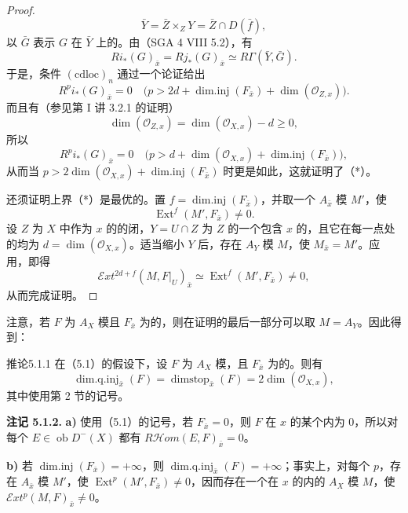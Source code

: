 \begin{proof}
\[
\bar Y=\bar Z\times_ZY=\bar Z\cap D(\bar f),
\]
以 $\bar G$ 表示 $G$ 在 $\bar Y$ 上的。由（SGA 4 VIII 5.2），有
\[
Ri_*(G)_{\bar x}=Rj_*(G)_{\bar x}\simeq R\Gamma(\bar Y,\bar G).
\]
于是，条件 $\mathrm{(cdloc)}_n$ 通过一个论证给出
\[
R^pi_*(G)_{\bar x}=0
\quad\bigl(p>2d+\operatorname{dim.inj}(F_{\bar x})+\dim(\mathcal O_{Z,x})\bigr).
\]
而且有（参见第 I 讲 3.2.1 的证明）
\[
\dim(\mathcal O_{Z,x})=\dim(\mathcal O_{X,x})-d\geq0,
\]
所以
\[
R^pi_*(G)_{\bar x}=0
\quad\bigl(p>d+\dim(\mathcal O_{X,x})+\operatorname{dim.inj}(F_{\bar x})\bigr),
\]
从而当 $p>2\dim(\mathcal O_{X,x})+\operatorname{dim.inj}(F_{\bar x})$ 时更是如此，这就证明了（*）。

还须证明上界（*）是最优的。置 $f=\operatorname{dim.inj}(F_{\bar x})$，并取一个 $A_{\bar x}$ 模 $M'$，使
\[
\operatorname{Ext}^f(M',F_{\bar x})\ne0.
\]
设 $Z$ 为 $X$ 中作为 $x$ 的的闭，$Y=U\cap Z$ 为 $Z$ 的一个包含 $x$ 的，且它在每一点处的均为 $d=\dim(\mathcal O_{X,x})$。适当缩小 $Y$ 后，存在 $A_Y$ 模 $M$，使 $M_{\bar x}=M'$。应用，即得
\[
\mathcal Ext^{2d+f}(M,F|_U)_{\bar x}
\simeq\operatorname{Ext}^f(M',F_{\bar x})\ne0,
\]
从而完成证明。
\end{proof}

注意，若 $F$ 为 $A_X$ 模且 $F_{\bar x}$ 为的，则在证明的最后一部分可以取 $M=A_Y$。因此得到：
\begin{SGAresult}{推论}{5.1.1}
在（5.1）的假设下，设 $F$ 为 $A_X$ 模，且 $F_{\bar x}$ 为的。则有
\[
\operatorname{dim.q.inj}_{\bar x}(F)
=\operatorname{dimstop}_{\bar x}(F)=2\dim(\mathcal O_{X,x}),
\]
其中使用第 2 节的记号。
\end{SGAresult}
\textbf{注记 5.1.2.}
\textbf{a)} 使用（5.1）的记号，若 $F_{\bar x}=0$，则 $F$ 在 $x$ 的某个内为 $0$，所以对每个 $E\in\operatorname{ob}D^-(X)$ 都有 $R\mathcal Hom(E,F)_{\bar x}=0$。

\textbf{b)} 若 $\operatorname{dim.inj}(F_{\bar x})=+\infty$，则 $\operatorname{dim.q.inj}_{\bar x}(F)=+\infty$；事实上，对每个 $p$，存在 $A_{\bar x}$ 模 $M'$，使 $\operatorname{Ext}^p(M',F_{\bar x})\ne0$，因而存在一个在 $x$ 的内的 $A_X$ 模 $M$，使 $\mathcal Ext^p(M,F)_{\bar x}\ne0$。

